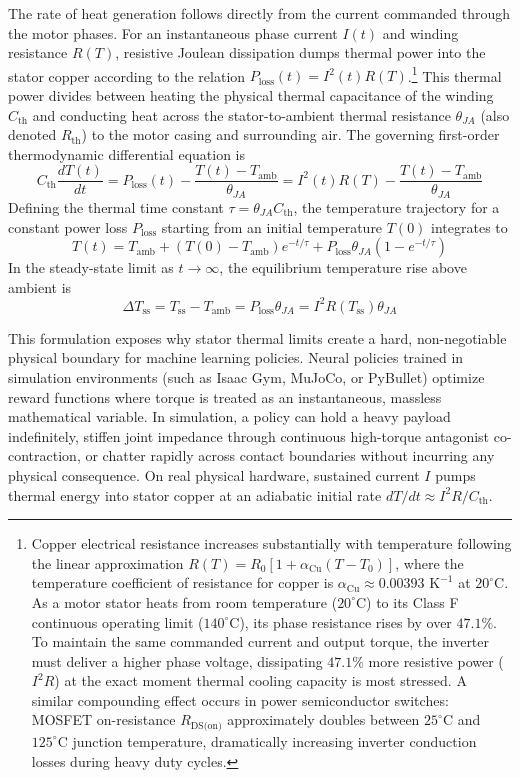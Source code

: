 \documentclass[
  letterpaper,
  DIV=11,
  numbers=noendperiod]{scrartcl}
\begin{document}
The rate of heat generation follows directly from the current commanded
through the motor phases. For an instantaneous phase current \(I(t)\)
and winding resistance \(R(T)\), resistive Joulean dissipation dumps
thermal power into the stator copper according to the relation
\(P_{\text{loss}}(t) = I^2(t) R(T)\).\footnote{Copper electrical
  resistance increases substantially with temperature following the
  linear approximation
  \(R(T) = R_0 [1 + \alpha_{\text{Cu}} (T - T_0)]\), where the
  temperature coefficient of resistance for copper is
  \(\alpha_{\text{Cu}} \approx 0.00393\text{ K}^{-1}\) at
  \(20^\circ\text{C}\). As a motor stator heats from room temperature
  (\(20^\circ\text{C}\)) to its Class F continuous operating limit
  (\(140^\circ\text{C}\)), its phase resistance rises by over
  \(47.1\%\). To maintain the same commanded current and output torque,
  the inverter must deliver a higher phase voltage, dissipating
  \(47.1\%\) more resistive power (\(I^2 R\)) at the exact moment
  thermal cooling capacity is most stressed. A similar compounding
  effect occurs in power semiconductor switches: MOSFET on-resistance
  \(R_{\text{DS(on)}}\) approximately doubles between
  \(25^\circ\text{C}\) and \(125^\circ\text{C}\) junction temperature,
  dramatically increasing inverter conduction losses during heavy duty
  cycles.} This thermal power divides between heating the physical
thermal capacitance of the winding \(C_{\text{th}}\) and conducting heat
across the stator-to-ambient thermal resistance \(\theta_{JA}\) (also
denoted \(R_{\text{th}}\)) to the motor casing and surrounding air. The
governing first-order thermodynamic differential equation is
\[C_{\text{th}} \frac{dT(t)}{dt} = P_{\text{loss}}(t) - \frac{T(t) - T_{\text{amb}}}{\theta_{JA}} = I^2(t) R(T) - \frac{T(t) - T_{\text{amb}}}{\theta_{JA}}\]
Defining the thermal time constant \(\tau = \theta_{JA} C_{\text{th}}\),
the temperature trajectory for a constant power loss \(P_{\text{loss}}\)
starting from an initial temperature \(T(0)\) integrates to
\[T(t) = T_{\text{amb}} + (T(0) - T_{\text{amb}}) e^{-t/\tau} + P_{\text{loss}} \theta_{JA} \left(1 - e^{-t/\tau}\right)\]
In the steady-state limit as \(t \to \infty\), the equilibrium
temperature rise above ambient is
\[\Delta T_{\text{ss}} = T_{\text{ss}} - T_{\text{amb}} = P_{\text{loss}} \theta_{JA} = I^2 R(T_{\text{ss}}) \theta_{JA}\]

This formulation exposes why stator thermal limits create a hard,
non-negotiable physical boundary for machine learning policies. Neural
policies trained in simulation environments (such as Isaac Gym, MuJoCo,
or PyBullet) optimize reward functions where torque is treated as an
instantaneous, massless mathematical variable. In simulation, a policy
can hold a heavy payload indefinitely, stiffen joint impedance through
continuous high-torque antagonist co-contraction, or chatter rapidly
across contact boundaries without incurring any physical consequence. On
real physical hardware, sustained current \(I\) pumps thermal energy
into stator copper at an adiabatic initial rate
\(dT/dt \approx I^2 R / C_{\text{th}}\).
\end{document}
